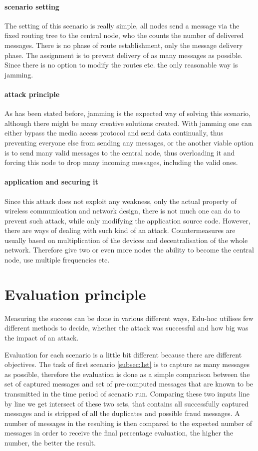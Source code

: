 \documentclass[
  print, %
  Table,   %
  nolof,     %
  nolot,     %
           oneside
]{fithesis3}
\begin{document}
    \paragraph{scenario setting}
    The setting of this scenario is really simple, all nodes send a message via the fixed routing tree to the central node, who the counts the number of delivered messages. There is no phase of route establishment, only the message delivery phase. The assignment is to prevent delivery of as many messages as possible. Since there is no option to modify the routes etc. the only reasonable way is jamming.

    \paragraph{attack principle}
    As has been stated before, jamming is the expected way of solving this scenario, although there might be many creative solutions created. With jamming one can either bypass the media access protocol and send data continually, thus preventing everyone else from sending any messages, or the another viable option is to send many valid messages to the central node, thus overloading it and forcing this node to drop many incoming messages, including the valid ones.

    \paragraph{application and securing it}
    Since this attack does not exploit any weakness, only the actual property of wireless communication and network design, there is not much one can do to prevent such attack, while only modifying the application source code. However, there are ways of dealing with such kind of an attack. Countermeasures are usually based on multiplication of the devices and decentralisation of the whole network. Therefore give two or even more nodes the ability to become the central node, use multiple frequencies etc. %

  \section{Evaluation principle}\label{sec:eval}
  Measuring the success can be done in various different ways, Edu-hoc utilises few different methods to decide, whether the attack was successful and how big was the impact of an attack.

  Evaluation for each scenario is a little bit different because there are different objectives. The task of first scenario \ref{subsec:1st} is to capture as many messages as possible, therefore the evaluation is done as a simple comparison between the set of captured messages and set of pre-computed messages that are known to be transmitted in the time period of scenario run. Comparing these two inputs line by line we get intersect of these two sets, that contains all successfully captured messages and is stripped of all the duplicates and possible fraud messages. A number of messages in the resulting is then compared to the expected number of messages in order to receive the final percentage evaluation, the higher the number, the better the result.
\end{document}
